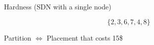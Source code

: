 \begin{frame}{Hardness \small(SDN with a single node)}

\onslide<+>
\onslide<+>
$$
\{2, 3, 6, 7, 4, 8\}
$$
\begin{center}
 
\end{center}
\vfill


\onslide<+->
\begin{center}
Partition $\iff$ Placement that costs 15\$ 
\end{center}


\end{frame}